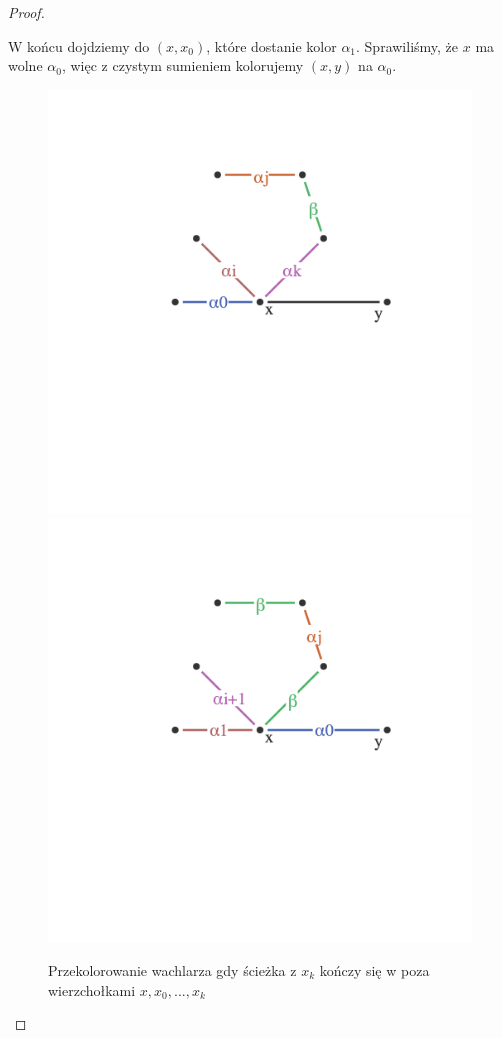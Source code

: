 \begin{proof}
\begin{enumerate}
            W końcu dojdziemy do $(x, x_0)$, które dostanie kolor $\alpha_1$. Sprawiliśmy, że $x$ ma wolne $\alpha_0$,
            więc z czystym sumieniem kolorujemy $(x, y)$ na $\alpha_0$. 
            
            \begin{figure}[H]
                \centering
                \includegraphics[scale=0.45]{chapters/dyskretna/colours/vizing/images/fan_case_one_before.png}
                \includegraphics[scale=0.45]{chapters/dyskretna/colours/vizing/images/fan_case_one_after.png}
                \caption{Przekolorowanie wachlarza gdy ścieżka z $x_k$ kończy się w poza wierzchołkami $x, x_0, ..., x_k$}
            \end{figure}
            

\end{enumerate}
\end{proof}
